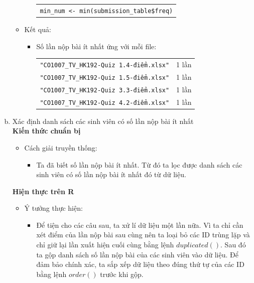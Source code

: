 \documentclass[a4paper]{article}
\theoremstyle{definition}
\begin{document}
\begin{enumerate}[a)]
\begin{itemize}
\begin{itemize}
\begin{center}
                \begin{tabular}{p{13cm}}
                    \texttt{min\_num <- min(submission\_table\$freq)}
                \end{tabular}
            \end{center}
        \end{itemize}
        \item Kết quả:
        \begin{itemize}
            \item Số lần nộp bài ít nhất ứng với mỗi file:
            \begin{center}
                \begin{tabular}{l l}
                     \texttt{"CO1007\_TV\_HK192-Quiz 1.4-điểm.xlsx"} & 1 lần\\ 
                     \texttt{"CO1007\_TV\_HK192-Quiz 1.5-điểm.xlsx"} & 1 lần\\ 
                     \texttt{"CO1007\_TV\_HK192-Quiz 3.3-điểm.xlsx"} & 1 lần\\ 
                     \texttt{"CO1007\_TV\_HK192-Quiz 4.2-điểm.xlsx"} & 1 lần\\ 
                \end{tabular}
            \end{center}
        \end{itemize}
    \end{itemize}
    \bf\item {Xác định danh sách các sinh viên có số lần nộp bài ít nhất} \\[6pt]
    \bf Kiến thức chuẩn bị\normalfont
    \begin{itemize}
        \item Cách giải truyền thống:
        \begin{itemize}
            \item Ta đã biết số lần nộp bài ít nhất. Từ đó ta lọc được danh sách các sinh viên có số lần nộp bài ít nhất đó từ dữ liệu.
        \end{itemize}
    \end{itemize}
    \bf Hiện thực trên R\normalfont
    \begin{itemize}
        \item Ý tưởng thực hiện:
        \begin{itemize}
            \item Để tiện cho các câu sau, ta xử lí dữ liệu một lần nữa. Vì ta chỉ cần xét điểm của lần nộp bài sau cùng nên ta loại bỏ các ID trùng lặp và chỉ giữ lại lần xuất hiện cuối cùng bằng lệnh $duplicated()$. Sau đó ta gộp danh sách số lần nộp bài của các sinh viên vào dữ liệu. Để đảm bảo chính xác, ta sắp xếp dữ liệu theo đúng thứ tự của các ID bằng lệnh $order()$ trước khi gộp.

\end{itemize}
\end{itemize}
\end{enumerate}
\end{document}
